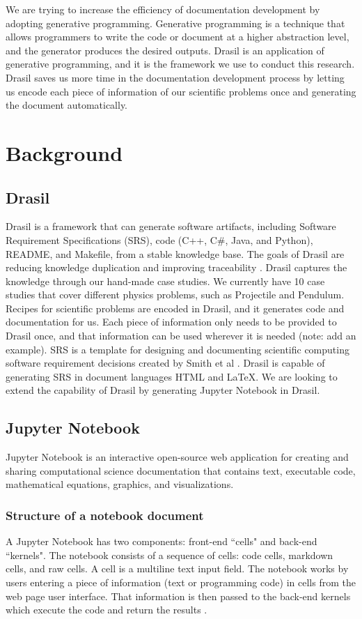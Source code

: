 We are trying to increase the efficiency of documentation development by 
adopting generative programming. Generative programming is a technique that 
allows programmers to write the code or document at a higher abstraction level, 
and the generator produces the desired outputs. Drasil is an application of 
generative programming, and it is the framework we use to conduct this 
research. Drasil saves us more time in the documentation development process by 
letting us encode each piece of information of our scientific problems once and 
generating the document automatically.


\section{Background}
\subsection{Drasil}
Drasil is a framework that can generate software artifacts, including Software 
Requirement Specifications (SRS), code (C++, C\#, Java, and Python), README, 
and Makefile, from a stable knowledge base. The goals of Drasil are reducing 
knowledge duplication and improving traceability \cite{drasil}. Drasil captures 
the knowledge through our hand-made case studies. We currently have 10 case 
studies that cover different physics problems, such as Projectile and Pendulum. 
Recipes for scientific problems are encoded in Drasil, and it generates code 
and documentation for us. Each piece of information only needs to be provided 
to Drasil once, and that information can be used wherever it is needed (note: 
add an example). SRS is a template for designing and documenting scientific 
computing software requirement decisions created by Smith et al 
\cite{smith2005new}. Drasil is capable of generating SRS in document languages 
HTML and LaTeX. We are looking to extend the capability of Drasil by generating 
Jupyter Notebook in Drasil.

\subsection{Jupyter Notebook}
Jupyter Notebook is an interactive open-source web application for creating and 
sharing computational science documentation that contains text, executable 
code, mathematical equations, graphics, and visualizations.

\subsubsection{Structure of a notebook document}
A Jupyter Notebook has two components: front-end ``cells" and back-end 
``kernels". The notebook consists of a sequence of cells: code cells, markdown 
cells, and raw cells. A cell is a multiline text input field. The notebook 
works by users entering a piece of information (text or programming code) in 
cells from the web page user interface. That information is then passed to the 
back-end kernels which execute the code and return the results 
\cite{notebookdoc}.

